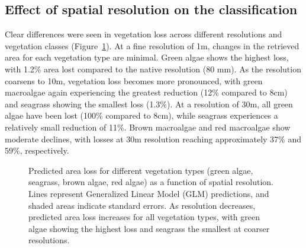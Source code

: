 \documentclass[
  number]{elsarticle}
\begin{document}
\subsection{Effect of spatial resolution on the
classification}\label{effect-of-spatial-resolution-on-the-classification}

Clear differences were seen in vegetation loss across different
resolutions and vegetation classes (Figure~\ref{fig-pixelsize}). At a
fine resolution of 1m, changes in the retrieved area for each vegetation
type are minimal. Green algae shows the highest loss, with 1.2\% area
lost compared to the native resolution (80 mm). As the resolution
coarsens to 10m, vegetation loss becomes more pronounced, with green
macroalgae again experiencing the greatest reduction (12\% compared to
8cm) and seagrass showing the smallest loss (1.3\%). At a resolution of
30m, all green algae have been lost (100\% compared to 8cm), while
seagrass experiences a relatively small reduction of 11\%. Brown
macroalgae and red macroalgae show moderate declines, with losses at 30m
resolution reaching approximately 37\% and 59\%, respectively.

\label{cell-fig-pixelsize}
\begin{figure}[H]


\caption{\label{fig-pixelsize}Predicted area loss for different
vegetation types (green algae, seagrass, brown algae, red algae) as a
function of spatial resolution. Lines represent Generalized Linear Model
(GLM) predictions, and shaded areas indicate standard errors. As
resolution decreases, predicted area loss increases for all vegetation
types, with green algae showing the highest loss and seagrass the
smallest at coarser resolutions.}

\end{figure}%
\end{document}
